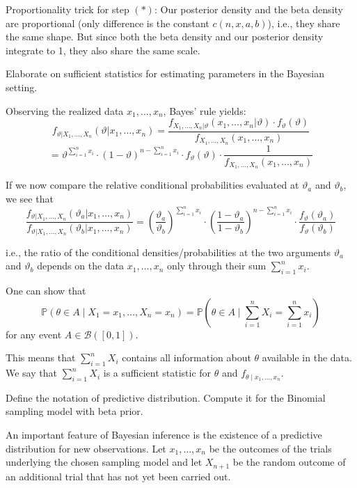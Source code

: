 Proportionality trick for step \((*)\):
Our posterior density and the beta density are proportional (only difference is the constant \(c(n, x, a, b)\)), i.e., they share the same shape.
But since both the beta density and our posterior density integrate to 1, they also share the same scale.


Elaborate on sufficient statistics for estimating parameters in the Bayesian setting.

Observing the realized data \(x_1, \ldots, x_n\), Bayes' rule yields:
\[
f_{\vartheta | X_1, \ldots, X_n}(\vartheta | x_1, \ldots, x_n) = \frac{f_{X_1, \ldots, X_n | \vartheta}(x_1, \ldots, x_n | \vartheta) \cdot f_{\vartheta}(\vartheta)}{f_{X_1, \ldots, X_n}(x_1, \ldots, x_n)}
\]
\[
= \vartheta^{\sum_{i=1}^{n} x_i} \cdot (1 - \vartheta)^{n-\sum_{i=1}^{n} x_i} \cdot f_{\vartheta}(\vartheta) \cdot \frac{1}{f_{X_1, \ldots, X_n}(x_1, \ldots, x_n)}
\]

If we now compare the relative conditional probabilities evaluated at \(\vartheta_a\) and \(\vartheta_b\), we see that
\[
\frac{f_{\vartheta|X_1, \ldots, X_n}(\vartheta_a | x_1, \ldots, x_n)}{f_{\vartheta|X_1, \ldots, X_n}(\vartheta_b | x_1, \ldots, x_n)}
= \left(\frac{\vartheta_a}{\vartheta_b}\right)^{\sum_{i=1}^{n} x_i} \cdot \left(\frac{1 - \vartheta_a}{1 - \vartheta_b}\right)^{n-\sum_{i=1}^{n} x_i} \cdot \frac{f_{\vartheta}(\vartheta_a)}{f_{\vartheta}(\vartheta_b)}
\]

i.e., the ratio of the conditional densities/probabilities at the two arguments \(\vartheta_a\) and \(\vartheta_b\) depends on the data 
\(x_1, \ldots, x_n\) only through their sum \(\sum_{i=1}^{n} x_i\).

One can show that
\[
\mathbb{P}(\theta \in A \mid X_1 = x_1, \ldots, X_n = x_n) = \mathbb{P}\left( \theta \in A \mid \sum_{i=1}^{n} X_i = \sum_{i=1}^{n} x_i \right)
\]
for any event \( A \in \mathcal{B}([0, 1]) \).

This means that \( \sum_{i=1}^{n} X_i \) contains all information about \( \theta \) available in the data.
We say that \( \sum_{i=1}^{n} X_i \) is a sufficient statistic for \( \theta \) and \( f_{\theta \mid x_1, \ldots, x_n} \).


Define the notation of predictive distribution. Compute it for the Binomial sampling model with beta prior.

An important feature of Bayesian inference is the existence of a predictive distribution for new observations.
Let \(x_1, \ldots, x_n\) be the outcomes of the trials underlying the chosen sampling model and let \(X_{n+1}\) be 
the random outcome of an additional trial that has not yet been carried out.

